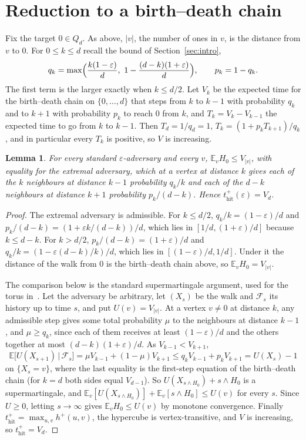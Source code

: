 \documentclass[11pt]{amsart}
\newtheorem{lemma}[theorem]{Lemma}
\theoremstyle{remark}
\newcommand{\eps}{\varepsilon}
\newcommand{\E}{\mathbb{E}}
\newcommand{\thit}{t_{\mathrm{hit}}}
\begin{document}
\section{Reduction to a birth--death chain}\label{sec:reduction}

Fix the target $0\in Q_d$. As above, $|v|$, the number of ones in $v$, is the distance from $v$ to $0$. For $0\le k\le d$ recall the bound of Section~\ref{sec:intro},
\[
q_k=\max\Bigl(\frac{k(1-\eps)}{d},\ 1-\frac{(d-k)(1+\eps)}{d}\Bigr),\qquad p_k=1-q_k .
\]
The first term is the larger exactly when $k\le d/2$. Let $V_k$ be the expected time for the birth--death chain on
$\{0,\dots,d\}$ that steps from $k$ to $k-1$ with probability $q_k$ and to $k+1$ with probability $p_k$ to reach $0$
from $k$, and $T_k=V_k-V_{k-1}$ the expected time to go from $k$ to $k-1$. Then $T_d=1/q_d=1$,
$T_k=(1+p_kT_{k+1})/q_k$, and in particular every $T_k$ is positive, so $V$ is increasing.

\begin{lemma}\label{lem:reduction}
For every standard $\eps$-adversary and every $v$, $\E_vH_0\le V_{|v|}$, with equality for the extremal adversary,
which at a vertex at distance $k$ gives each of the $k$ neighbours at distance $k-1$ probability $q_k/k$ and each of the $d-k$
neighbours at distance $k+1$ probability $p_k/(d-k)$. Hence $\thit^+(\eps)=V_d$.
\end{lemma}

\begin{proof}
The extremal adversary is admissible. For $k\le d/2$, $q_k/k=(1-\eps)/d$ and $p_k/(d-k)=(1+\eps k/(d-k))/d$, which lies
in $[1/d,(1+\eps)/d]$ because $k\le d-k$. For $k>d/2$, $p_k/(d-k)=(1+\eps)/d$ and $q_k/k=(1-\eps(d-k)/k)/d$, which
lies in $[(1-\eps)/d,1/d]$. Under it the distance of the walk from $0$ is the birth--death chain above, so $\E_vH_0=V_{|v|}$.

The comparison below is the standard supermartingale argument, used for the torus in~\cite[Lemma~2.1]{ShmTorus}. Let
the adversary be arbitrary, let $(X_s)$ be the walk and $\mathcal F_s$ its history up to time $s$, and put
$U(v)=V_{|v|}$. At a vertex $v\ne0$ at distance $k$, any admissible step gives some total probability $\mu$ to the neighbours at distance $k-1$, and $\mu\ge q_k$, since each
of them receives at least
$(1-\eps)/d$ and the others together at most $(d-k)(1+\eps)/d$. As $V_{k-1}<V_{k+1}$,
\[
\E\bigl[U(X_{s+1})\,\big|\,\mathcal F_s\bigr]=\mu V_{k-1}+(1-\mu)V_{k+1}\le q_kV_{k-1}+p_kV_{k+1}=U(X_s)-1
\]
on $\{X_s=v\}$, where the last equality is the first-step equation of the birth--death chain (for $k=d$ both sides
equal $V_{d-1}$). So $U(X_{s\wedge H_0})+s\wedge H_0$ is a supermartingale, and $\E_v[U(X_{s\wedge H_0})]+\E_v[s\wedge
H_0]\le U(v)$ for every $s$. Since $U\ge0$, letting $s\to\infty$ gives $\E_vH_0\le U(v)$ by monotone convergence.
Finally $\thit^+=\max_{u,v}h^+(u,v)$, the hypercube is vertex-transitive, and $V$ is increasing, so
$\thit^+=V_d$.
\end{proof}
\end{document}
